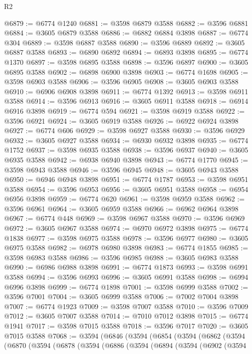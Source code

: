 \begin{lexlean}{R2}
\begin{coremodule}
@6879 := @6774 @1240
@6881 := @3598 @6879 @3588
@6882 := @3596 @6881
@6884 := @3605 @6879 @3588
@6886 := @6882 @6884 @3898
@6887 := @6774 @304
@6889 := @3598 @6887 @3588
@6890 := @3596 @6889
@6892 := @3605 @6887 @3588
@6893 := @6890 @6892
@6894 := @6893 @3898
@6895 := @6774 @1370
@6897 := @3598 @6895 @3588
@6898 := @3596 @6897
@6900 := @3605 @6895 @3588
@6902 := @6898 @6900 @3898
@6903 := @6774 @1698
@6905 := @3598 @6903 @3588
@6906 := @3596 @6905
@6908 := @3605 @6903 @3588
@6910 := @6906 @6908 @3898
@6911 := @6774 @1392
@6913 := @3598 @6911 @3588
@6914 := @3596 @6913
@6916 := @3605 @6911 @3588
@6918 := @6914 @6916 @3898
@6919 := @6774 @594
@6921 := @3598 @6919 @3588
@6922 := @3596 @6921
@6924 := @3605 @6919 @3588
@6926 := @6922 @6924 @3898
@6927 := @6774 @606
@6929 := @3598 @6927 @3588
@6930 := @3596 @6929
@6932 := @3605 @6927 @3588
@6934 := @6930 @6932 @3898
@6935 := @6774 @1752
@6937 := @3598 @6935 @3588
@6938 := @3596 @6937
@6940 := @3605 @6935 @3588
@6942 := @6938 @6940 @3898
@6943 := @6774 @1770
@6945 := @3598 @6943 @3588
@6946 := @3596 @6945
@6948 := @3605 @6943 @3588
@6950 := @6946 @6948 @3898
@6951 := @6774 @1787
@6953 := @3598 @6951 @3588
@6954 := @3596 @6953
@6956 := @3605 @6951 @3588
@6958 := @6954 @6956 @3898
@6959 := @6774 @620
@6961 := @3598 @6959 @3588
@6962 := @3596 @6961
@6964 := @3605 @6959 @3588
@6966 := @6962 @6964 @3898
@6967 := @6774 @448
@6969 := @3598 @6967 @3588
@6970 := @3596 @6969
@6972 := @3605 @6967 @3588
@6974 := @6970 @6972 @3898
@6975 := @6774 @1838
@6977 := @3598 @6975 @3588
@6978 := @3596 @6977
@6980 := @3605 @6975 @3588
@6982 := @6978 @6980 @3898
@6983 := @6774 @1855
@6985 := @3598 @6983 @3588
@6986 := @3596 @6985
@6988 := @3605 @6983 @3588
@6990 := @6986 @6988 @3898
@6991 := @6774 @1873
@6993 := @3598 @6991 @3588
@6994 := @3596 @6993
@6996 := @3605 @6991 @3588
@6998 := @6994 @6996 @3898
@6999 := @6774 @1898
@7001 := @3598 @6999 @3588
@7002 := @3596 @7001
@7004 := @3605 @6999 @3588
@7006 := @7002 @7004 @3898
@7007 := @6774 @1923
@7009 := @3598 @7007 @3588
@7010 := @3596 @7009
@7012 := @3605 @7007 @3588
@7014 := @7010 @7012 @3898
@7015 := @6774 @1941
@7017 := @3598 @7015 @3588
@7018 := @3596 @7017
@7020 := @3605 @7015 @3588
@7068 := @3594
    (@6846
      (@3594
        (@6854
          (@3594
            (@6862
              (@3594
                (@6870
                  (@3594
                    (@6878
                      (@3594
                        (@6886
                          (@3594
                            (@6894
                              (@3594
                                (@6902
                                  (@3594

\end{coremodule}
\end{lexlean}
